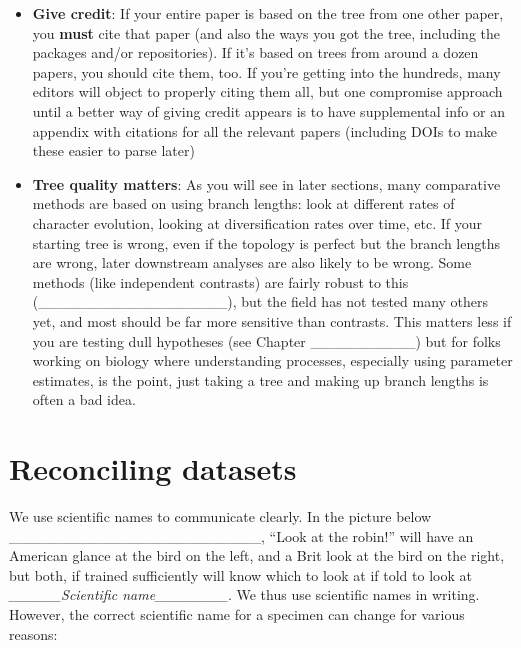 \documentclass[]{book}
\providecommand{\tightlist}{%
  \setlength{\itemsep}{0pt}\setlength{\parskip}{0pt}}
\theoremstyle{definition}
\theoremstyle{definition}
\theoremstyle{remark}
\begin{document}
\begin{itemize}
\tightlist
\item
  \textbf{Give credit}: If your entire paper is based on the tree from
  one other paper, you \textbf{must} cite that paper (and also the ways
  you got the tree, including the packages and/or repositories). If it's
  based on trees from around a dozen papers, you should cite them, too.
  If you're getting into the hundreds, many editors will object to
  properly citing them all, but one compromise approach until a better
  way of giving credit appears is to have supplemental info or an
  appendix with citations for all the relevant papers (including DOIs to
  make these easier to parse later)
\item
  \textbf{Tree quality matters}: As you will see in later sections, many
  comparative methods are based on using branch lengths: look at
  different rates of character evolution, looking at diversification
  rates over time, etc. If your starting tree is wrong, even if the
  topology is perfect but the branch lengths are wrong, later downstream
  analyses are also likely to be wrong. Some methods (like independent
  contrasts) are fairly robust to this
  (\_\_\_\_\_\_\_\_\_\_\_\_\_\_\_\_\_\_), but the field has not tested
  many others yet, and most should be far more sensitive than contrasts.
  This matters less if you are testing dull hypotheses (see Chapter
  \_\_\_\_\_\_\_\_\_\_) but for folks working on biology where
  understanding processes, especially using parameter estimates, is the
  point, just taking a tree and making up branch lengths is often a bad
  idea.
\end{itemize}

\section{Reconciling datasets}\label{reconciling-datasets}

We use scientific names to communicate clearly. In the picture below
\_\_\_\_\_\_\_\_\_\_\_\_\_\_\_\_\_\_\_\_\_\_\_\_, ``Look at the robin!''
will have an American glance at the bird on the left, and a Brit look at
the bird on the right, but both, if trained sufficiently will know which
to look at if told to look at \emph{\_\_\_\_\_Scientific
name\_\_\_\_\_\_\_}. We thus use scientific names in writing. However,
the correct scientific name for a specimen can change for various
reasons:
\end{document}
